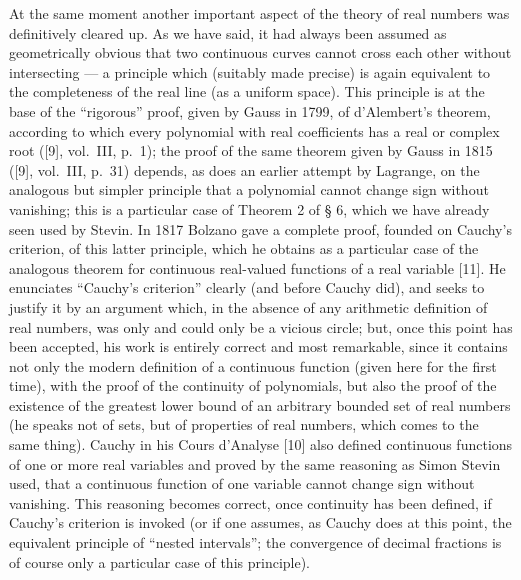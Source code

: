 At the same moment another important aspect of the theory of real numbers was definitively cleared up. As we have said, it had always been assumed as geometrically obvious that two continuous curves cannot cross each other without intersecting --- a principle which (suitably made precise) is again equivalent to the completeness of the real line (as a uniform space). This principle is at the base of the ``rigorous'' proof, given by Gauss in 1799, of d'Alembert's theorem, according to which every polynomial with real coefficients has a real or complex root ({[}9{]}, vol.~III, p.~1); the proof of the same theorem given by Gauss in 1815 ({[}9{]}, vol.~III, p.~31) depends, as does an earlier attempt by Lagrange, on the analogous but simpler principle that a polynomial cannot change sign without vanishing; this is a particular case of Theorem 2 of § 6, which we have already seen used by Stevin. In 1817 Bolzano gave a complete proof, founded on Cauchy's criterion, of this latter principle, which he obtains as a particular case of the analogous theorem for continuous real-valued functions of a real variable {[}11{]}. He enunciates ``Cauchy's criterion'' clearly (and before Cauchy did), and seeks to justify it by an argument which, in the absence of any arithmetic definition of real numbers, was only and could only be a vicious circle; but, once this point has been accepted, his work is entirely correct and most remarkable, since it contains not only the modern definition of a continuous function (given here for the first time), with the proof of the continuity of polynomials, but also the proof of the existence of the greatest lower bound of an arbitrary bounded set of real numbers (he speaks not of sets, but of properties of real numbers, which comes to the same thing). Cauchy in his Cours d'Analyse {[}10{]} also defined continuous functions of one or more real variables and proved by the same reasoning as Simon Stevin used, that a continuous function of one variable cannot change sign without vanishing. This reasoning becomes correct, once continuity has been defined, if Cauchy's criterion is invoked (or if one assumes, as Cauchy does at this point, the equivalent principle of ``nested intervals''; the convergence of decimal fractions is of course only a particular case of this principle).

